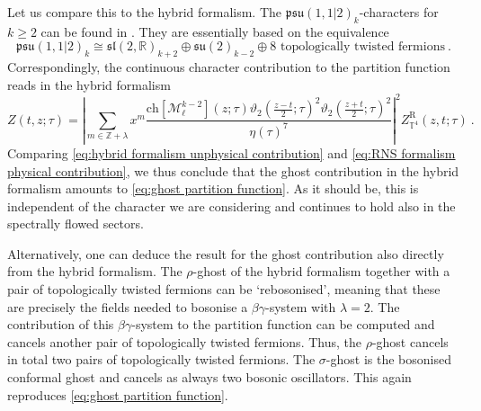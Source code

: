 \documentclass[12pt,a4paper]{article}
\newcommand{\be}{\begin{equation}}
\newcommand{\ee}{\end{equation}}
\begin{document}
Let us compare this to the hybrid formalism. The $\mathfrak{psu}(1,1|2)_k$-characters for $k \ge 2$ can be found in \cite{Gotz:2006qp}. They are essentially based on the equivalence \cite{Bars:1990hx, Berkovits:1999im, Gotz:2006qp} 
\be 
\mathfrak{psu}(1,1|2)_k \cong \mathfrak{sl}(2,\mathds{R})_{k+2} \oplus \mathfrak{su}(2)_{k-2} \oplus \text{8 topologically twisted fermions}\ .
\ee
Correspondingly, the continuous character contribution to the partition function reads in the hybrid formalism
\be 
Z(t,z;\tau)=\left|\sum_{m \in \mathds{Z}+\lambda} x^m \frac{\mathrm{ch}[\mathscr{M}_\ell^{k-2}](z;\tau)\vartheta_2(\frac{z-t}{2};\tau)^2\vartheta_2(\frac{z+t}{2};\tau)^2}{\eta(\tau)^7}\right|^2 Z_{\mathbb{T}^4}^\text{R}(z,t;\tau) \ . \label{eq:hybrid formalism unphysical contribution}
\ee
Comparing \eqref{eq:hybrid formalism unphysical contribution} and \eqref{eq:RNS formalism physical contribution}, we thus conclude that the ghost contribution in the hybrid formalism amounts to \eqref{eq:ghost partition function}. As it should be, this is independent of the character we are considering and continues to hold also in the spectrally flowed sectors. 
\smallskip

Alternatively, one can deduce the result for the ghost contribution also directly from the hybrid formalism. The $\rho$-ghost of the hybrid formalism together with a pair of topologically twisted fermions can be `rebosonised', meaning that these are precisely the fields needed to bosonise a $\beta\gamma$-system with $\lambda=2$. The contribution of this $\beta\gamma$-system to the partition function can be computed and cancels another pair of topologically twisted fermions. Thus, the $\rho$-ghost cancels in total two pairs of topologically twisted fermions. The $\sigma$-ghost is the bosonised conformal ghost and cancels as always two bosonic oscillators. This again reproduces \eqref{eq:ghost partition function}.
\end{document}
